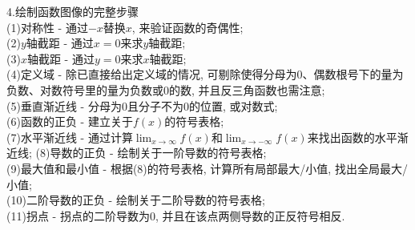 \documentclass[UTF8, fontset=ubuntu]{ctexart}
\begin{document}
4.绘制函数图像的完整步骤\\
(1)对称性 - 通过$-x$替换$x$, 来验证函数的奇偶性;\\
(2)$y$轴截距 - 通过$x=0$来求$y$轴截距;\\
(3)$x$轴截距 - 通过$y=0$来求$x$轴截距;\\
(4)定义域 - 除已直接给出定义域的情况, 可剔除使得分母为0、偶数根号下的量为负数、对数符号里的量为负数或0的数, 并且反三角函数也需注意;\\
(5)垂直渐近线 - 分母为0且分子不为0的位置, 或对数式;\\
(6)函数的正负 - 建立关于$f(x)$的符号表格;\\
(7)水平渐近线 - 通过计算$\lim_{x\to\infty}f(x)$和$\lim_{x\to -\infty}f(x)$来找出函数的水平渐近线;
(8)导数的正负 - 绘制关于一阶导数的符号表格;\\
(9)最大值和最小值 - 根据(8)的符号表格, 计算所有局部最大/小值, 找出全局最大/小值;\\
(10)二阶导数的正负 - 绘制关于二阶导数的符号表格;\\
(11)拐点 - 拐点的二阶导数为0, 并且在该点两侧导数的正反符号相反.\\[2ex]
\end{document}
